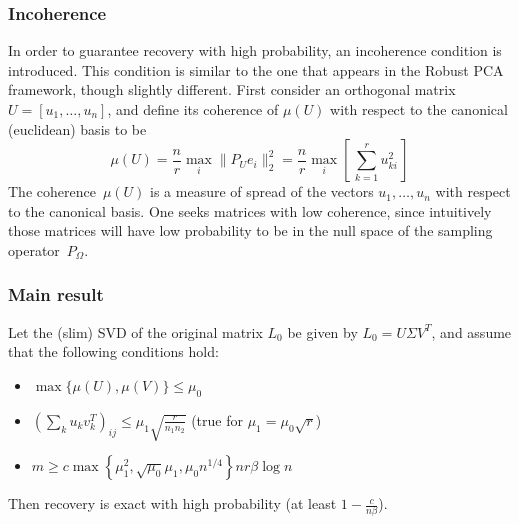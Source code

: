\subsubsection{Incoherence}
%
In order to guarantee recovery with high probability, an incoherence condition is introduced. This condition is similar to the one that appears in the Robust PCA framework, though slightly different. First consider an orthogonal matrix $U = [u_1, \dots, u_n]$, and define its coherence of $\mu(U)$ with respect to the canonical (euclidean) basis to be
%
\begin{equation}
\mu(U) = \frac{n}{r} \max_i \|P_U e_i\|_2^2 = \frac{n}{r} \max_i \left[\, \sum_{k=1}^r u_{ki}^2 \,\right]
\label{emc_incoherence}
\end{equation}
%
The coherence~$\mu(U)$ is a measure of spread of the vectors $u_1, \dots, u_n$ with respect to the canonical basis. One seeks matrices with low coherence, since intuitively those matrices will have low probability to be in the null space of the sampling operator~$P_\Omega$.


\subsubsection{Main result}
%
\begin{theorem}
\label{thm:exact_matrix_recovery}
Let the (slim) SVD of the original matrix $L_0$ be given by $L_0 = U \Sigma V^T$, and assume that the following conditions hold:
\begin{itemize}
\item $\max \{\mu(U), \mu(V)\} \leq \mu_0$
\item $\left( \sum_k u_kv_k^T\right)_{ij} \leq \mu_1 \sqrt{\frac{r}{n_1 n_2}}$ (true for $\mu_1 = \mu_0\sqrt{r}$)
\item $m \geq c \max \left\{ \mu_1^2, \sqrt{\mu_0}\mu_1, \mu_0 n^{1/4} \right\}n r \beta \log n$
\end{itemize}
Then recovery is exact with high probability (at least $1-\frac{c}{n\beta}$).
\end{theorem}


